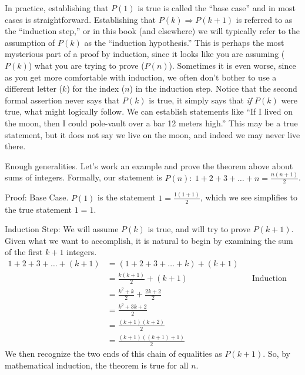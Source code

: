 %
\begin{para}In practice, establishing that $P(1)$ is true is called the ``base case'' and in most cases is straightforward.  Establishing that $P(k)\Rightarrow P(k+1)$ is referred to as the ``induction step,'' or in this book (and elsewhere) we will typically refer to the assumption of $P(k)$ as the ``induction hypothesis.''  This is perhaps the most mysterious part of a proof by induction, since it looks like you are assuming ($P(k)$) what you are trying to prove ($P(n)$).  Sometimes it is even worse, since as you get more comfortable with induction, we often don't bother to use a different letter ($k$) for the index ($n$) in the induction step.  Notice that the second formal assertion never says that $P(k)$ is true, it simply says that {\em if} $P(k)$ were true, what might logically follow.  We can establish statements like ``If I lived on the moon, then I could pole-vault over a bar 12 meters high.''  This may be a true statement, but it does not say we live on the moon, and indeed we may never live there.\end{para}
%
\begin{para}Enough generalities.  Let's work an example and prove the theorem above about sums of integers.  Formally, our statement is $P(n):\ 1+2+3+\dots+n=\displaystyle\frac{n(n+1)}{2}$.\end{para}
%
\begin{para}Proof:  Base Case.  $P(1)$ is the statement $1=\frac{1(1+1)}{2}$, which we see simplifies to the true statement $1=1$.\end{para}
%
\begin{para}Induction Step:  We will assume $P(k)$ is true, and will try to prove $P(k+1)$.  Given what we want to accomplish, it is natural to begin by examining the sum of the first $k+1$ integers.
%
\begin{align*}
1+2+3+\dots+(k+1)
%
&=\left(1+2+3+\dots+k\right) + (k+1)\\
%
&=\frac{k(k+1)}{2} + (k+1)&&\text{Induction Hypothesis}\\
%
&=\frac{k^2+k}{2} + \frac{2k+2}{2}\\
%
&=\frac{k^2+3k+2}{2}\\
%
&=\frac{(k+1)(k+2)}{2}\\
%
&=\frac{(k+1)((k+1)+1)}{2}
%
\end{align*}
%
We then recognize the two ends of this chain of equalities as $P(k+1)$.  So, by mathematical induction, the theorem is true for all $n$.\end{para}
